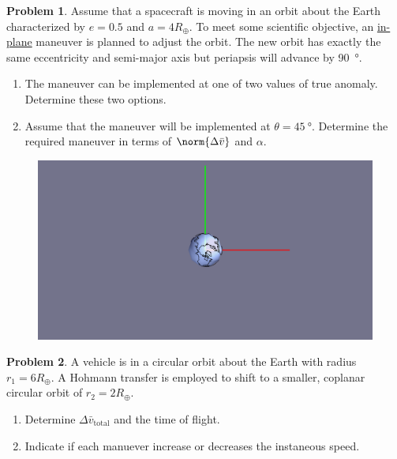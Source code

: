 \documentclass[10pt]{article}
\theoremstyle{definition}
\newtheorem{prob}{Problem}[section]
\newenvironment{subprob}%
{\renewcommand{\theenumi}{\alph{enumi}}\renewcommand{\labelenumi}{(\theenumi)}\begin{enumerate}}%
{\end{enumerate}}%
\begin{document}
\begin{prob}
    Assume that a spacecraft is moving in an orbit about the Earth characterized by \( e = 0.5\) and \( a = 4 R_\oplus\).
    To meet some scientific objective, an \underline{in-plane} maneuver is planned to adjust the orbit.
    The new orbit has exactly the same eccentricity and semi-major axis but periapsis will advance by \SI{90}{\degree}.
    \begin{subprob}
        \item The maneuver can be implemented at one of two values of true anomaly. 
            Determine these two options.
        \item Assume that the maneuver will be implemented at \( \theta = \SI{45}{\degree}\).
            Determine the required maneuver in terms of \( \norm{\Delta \bar v} \) and \(\alpha\).
    \end{subprob}
    \vspace*{9cm} 
    \begin{figure}[hb]
        \centering
        \includegraphics[width=\textwidth]{prob2.png}
    \end{figure}
\end{prob}
\clearpage\newpage
\null\newpage
\null\newpage

\begin{prob}
    A vehicle is in a circular orbit about the Earth with radius \( r_1 = 6 R_\oplus\).
    A Hohmann transfer is employed to shift to a smaller, coplanar  circular orbit of \( r_2 = 2 R_\oplus\).
    \begin{subprob}
        \item Determine \( \Delta \bar v_{\text{total}}\) and the time of flight.
        \item Indicate if each manuever increase or decreases the instaneous speed.
    \end{subprob}
\end{prob}
\end{document}

